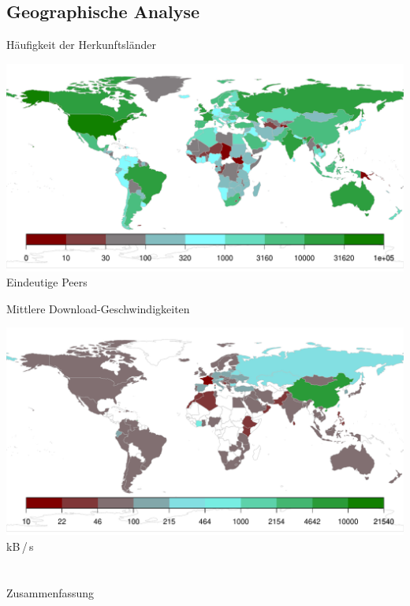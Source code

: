\documentclass[dvipsnames]{beamer} %
\begin{document}
	\subsection{Geographische Analyse}
	\begin{frame}{Häufigkeit der Herkunftsländer}
		\begin{center}
	    \includegraphics[width=\textwidth]{../result/2015-08-30_20-combined_location_map}\\
	    {\small Eindeutige Peers}
	  \end{center}
	\end{frame}

	\begin{frame}{Mittlere Download-Geschwindigkeiten}
		\begin{center}
	    \includegraphics[width=\textwidth]{../result/2015-08-30_20-combined_speed_map}\\
	    {\small kB\,/\,s}
	  \end{center}
	\end{frame}

	\section{}
	\begin{frame}{Zusammenfassung}
		\tableofcontents
	\end{frame}
\end{document}
